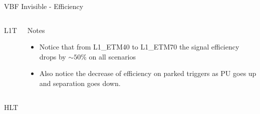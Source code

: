 \documentclass[8pt]{beamer}
\begin{document}
\begin{frame}{VBF Invisible - Efficiency}

\begin{columns}

\begin{block}{L1T}
\centering

\resizebox{1.0\linewidth}{!}{

}
\end{block}

\begin{block}{Notes}
 
\begin{itemize}
  \item Notice that from L1\_ETM40 to L1\_ETM70 the signal efficiency drops by $\sim50\%$ on all scenarios
  \item Also notice the decrease of efficiency on parked triggers as PU goes up and separation goes down.
\end{itemize}
 
\end{block}

\end{columns}

\begin{block}{HLT}
\centering
 
\resizebox{0.8\linewidth}{!}{  }

\end{block}

\end{frame}
\end{document}
